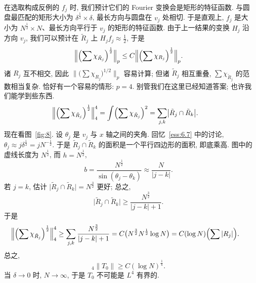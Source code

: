 
在选取构成反例的 $f_j$ 时, 我们预计它们的 Fourier 变换会是矩形的特征函数. 与圆盘最匹配的矩形大小为 $\delta^{\frac{1}{2}}\times\delta$, 最长方向与圆盘在 $v_j$ 处相切. 于是直观上, $f_j$ 是大小为 $N^{\frac{1}{2}}\times N$、最长方向平行于 $v_j$ 的矩形的特征函数. 由于上一结果的变换 $H_j$ 沿方向 $v_j$, 我们可以预计在 $\tilde{R}_j$ 上 $H_jf_j\approx\frac{1}{2}$, 于是
\[
\Bigl\|\Bigl(\sum\chi_{\tilde{R}_{j}}\Bigr)^{\frac{1}{2}}\Bigr\|_{p}\leq C\Bigl\|\Bigl(\sum\chi_{R_{j}}\Bigr)^{\frac{1}{2}}\Bigr\|_{p}.
\]
诸 $R_j$ 互不相交, 因此 $\bigl\|\bigl(\sum\chi_{R_j}\bigr)^{1/2}\bigr\|_p$ 容易计算; 但诸 $\tilde{R}_j$ 相互重叠, $\sum\chi_{\tilde{R}_j}$ 的范数相当复杂. 恰好有一个容易的情形: $p=4$. 别管我们在这里已经知道答案; 也许我们能学到些东西.
\begin{align*}
\Bigl\|\Bigl(\sum\chi_{\tilde{R}_{j}}\Bigr)^{\frac{1}{2}}\Bigr\|_{4}^{4}
&=\int\Bigl(\sum\chi_{\tilde{R}_{j}}\Bigr)^{2}
=\sum_{j,k}\bigl|\tilde{R}_{j}\cap\tilde{R}_{k}\bigr|.
\end{align*}
现在看图~\ref{fig:8}. 设 $\theta_j$ 是 $v_j$ 与 $x$ 轴之间的夹角. 回忆~\ref*{ess:6.7} 中的讨论, $\theta_j\approx j\delta^{\frac{1}{2}}=jN^{-\frac{1}{2}}$. 于是 $\tilde{R}_j\cap\tilde{R}_k$ 的面积是一个平行四边形的面积, 即底乘高. 图中的虚线长度为 $N^{\frac{1}{2}}$, 而 $h=N^{\frac{1}{2}}$,
\[
b=\frac{N^{\frac{1}{2}}}{\sin(\theta_{j}-\theta_{k})}\approx\frac{N}{|j-k|}.
\]
若 $j=k$, 估计 $\bigl|\tilde{R}_j\cap\tilde{R}_k\bigr|=N^{\frac{3}{2}}$ 更好; 总之,
\[
\bigl|\tilde{R}_{j}\cap\tilde{R}_{k}\bigr|\geq\frac{N^{\frac{3}{2}}}{|j-k|+1}.
\]
于是
\begin{align*}
\Bigl\|\Bigl(\sum\chi_{\tilde{R}_{j}}\Bigr)^{\frac{1}{2}}\Bigr\|_{4}^{4}
&\geq\sum_{j,k}\frac{N^{\frac{3}{2}}}{|j-k|+1}
=C\bigl(N^{\frac{3}{2}}N^{\frac{1}{2}}\log N\bigr)
=C(\log N)\Bigl(\sum|R_{j}|\Bigr).
\end{align*}
总之,
\[
{}_{4}\|T_{0}\|\geq C(\log N)^{\frac{1}{4}}.
\]
当 $\delta\to 0$ 时, $N\to\infty$, 于是 $T_0$ 不可能是 $L^4$ 有界的.

